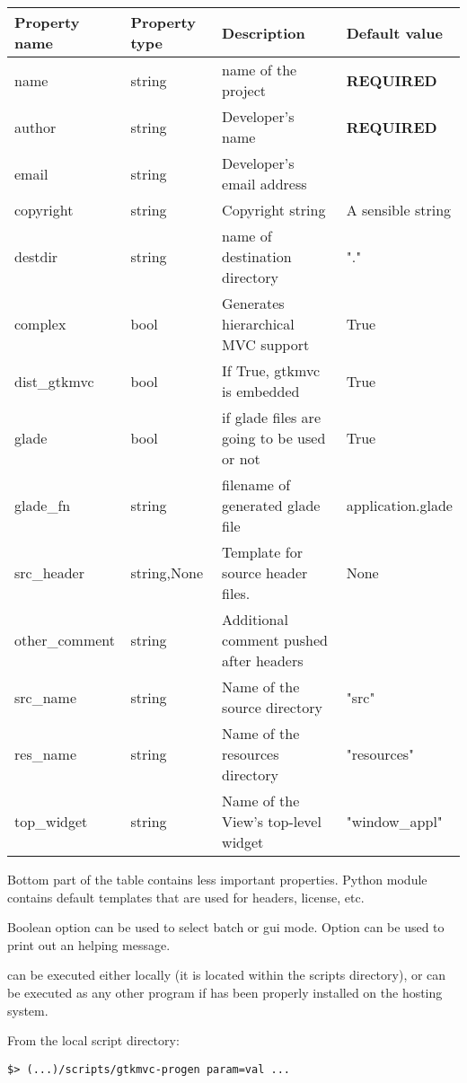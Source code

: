 \begin{center}
\begin{tabular}{|l|l|l|l|}
\hline
Property name& Property type & Description & Default value\\[0.5ex]
\hline
name & string & name of the project & \textbf{REQUIRED} \\
author & string & Developer's name & \textbf{REQUIRED} \\
email & string & Developer's email address & \\
copyright & string & Copyright string & A sensible string\\
destdir & string & name of destination directory & "." \\
complex & bool & Generates hierarchical MVC support & True \\
dist\_gtkmvc & bool & If True, gtkmvc is embedded & True \\
glade & bool & if glade files are going to be used or not & True \\
\hline
glade\_fn & string & filename of generated glade file & application.glade \\
src\_header & string,None & Template for source header files. & None \\
other\_comment & string & Additional comment pushed after headers &  \\ 
src\_name & string & Name of the source directory & "src" \\
res\_name & string & Name of the resources directory & "resources" \\
top\_widget & string & Name of the View's top-level widget & "window\_appl" \\
\hline
\end{tabular} 
\end{center}

Bottom part of the table contains less important properties. Python
module  contains default templates that
are used for headers, license, etc. 

Boolean option  can be used to select batch or gui
mode. Option  can be used to print out an helping message.

\bigskip

 can be executed either locally (it is located
within the scripts directory), or can be executed as any other program
if \pygtkmvc has been properly installed on the hosting system.

From the local script directory:
\begin{verbatim}
$> (...)/scripts/gtkmvc-progen param=val ...
\end{verbatim}


